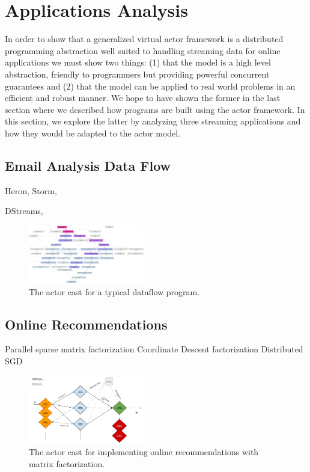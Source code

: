 \documentclass[conference,twocolumn,11pt]{IEEEtran}
\begin{document}
\section{Applications Analysis}

In order to show that a generalized virtual actor framework is a distributed programming abstraction well suited to handling streaming data for online applications we must show two things: (1) that the model is a high level abstraction, friendly to programmers but providing powerful concurrent guarantees and (2) that the model can be applied to real world problems in an efficient and robust manner. We hope to have shown the former in the last section where we described how programs are built using the actor framework. In this section, we explore the latter by analyzing three streaming applications and how they would be adapted to the actor model.

\subsection{Email Analysis Data Flow}

Heron, \cite{kulkarni_twitter_2015}
Storm, \cite{toshniwal_storm_2014}

DStreams, \cite{zaharia_discretized_2012}

\begin{figure}[!h]
    \centering
    \includegraphics[width=0.45\textwidth]{dataflow_cast}
    \caption{The actor cast for a typical dataflow program.}
    \label{fig:dataflow_cast}
\end{figure}

\subsection{Online Recommendations}

Parallel sparse matrix factorization \cite{gupta_highly_1997}
Coordinate Descent factorization \cite{yu_scalable_2012}
Distributed SGD \cite{gemulla_large-scale_2011}

\begin{figure}[!h]
    \centering
    \includegraphics[width=0.45\textwidth]{nnmf_cast}
    \caption{The actor cast for implementing online recommendations with matrix factorization.}
    \label{fig:nnmf_cast}
\end{figure}
\end{document}
